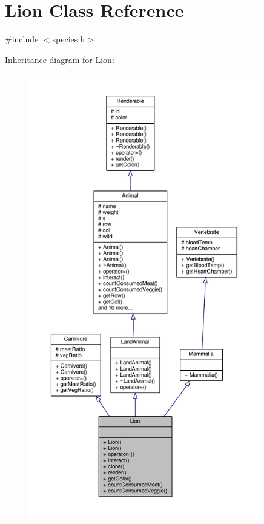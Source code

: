 \hypertarget{classLion}{}\section{Lion Class Reference}
\label{classLion}


{\ttfamily \#include $<$species.\+h$>$}



Inheritance diagram for Lion\+:
\nopagebreak
\begin{figure}[H]
\begin{center}
\leavevmode
\includegraphics[height=550pt]{classLion__inherit__graph}
\end{center}
\end{figure}


